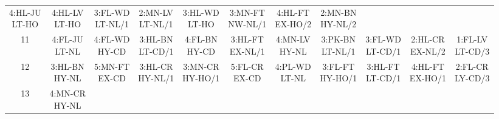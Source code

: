 \begin{table}[htbp]
{\begin{minipage}{0.9\textwidth}
\begin{tabular}{c|cccccccccc}
    \parbox{\cellwidth}{4:HL-JU\\LT-HO} & 
    \parbox{\cellwidth}{4:HL-LV\\LT-HO} & 
    \parbox{\cellwidth}{3:FL-WD\\LT-NL/1} & 
    \parbox{\cellwidth}{2:MN-LV\\LT-NL/1} & 
    \parbox{\cellwidth}{3:HL-WD\\LT-HO} & 
    \parbox{\cellwidth}{3:MN-FT\\NW-NL/1} & 
    \parbox{\cellwidth}{4:HL-FT\\EX-HO/2} & 
    \parbox{\cellwidth}{2:MN-BN\\HY-NL/2}\\[\extralinespace]
    11 & 
    \parbox{\cellwidth}{4:FL-JU\\LT-NL} & 
    \parbox{\cellwidth}{4:FL-WD\\HY-CD} & 
    \parbox{\cellwidth}{3:HL-BN\\LT-CD/1} & 
    \parbox{\cellwidth}{4:FL-BN\\HY-CD} & 
    \parbox{\cellwidth}{3:HL-FT\\EX-NL/1} & 
    \parbox{\cellwidth}{4:MN-LV\\HY-NL} & 
    \parbox{\cellwidth}{3:PK-BN\\LT-NL/1} & 
    \parbox{\cellwidth}{3:FL-WD\\LT-CD/1} & 
    \parbox{\cellwidth}{2:HL-CR\\EX-NL/2} & 
    \parbox{\cellwidth}{1:FL-LV\\LT-CD/3}\\[\extralinespace]
    12 & 
    \parbox{\cellwidth}{3:HL-BN\\HY-NL} & 
    \parbox{\cellwidth}{5:MN-FT\\EX-CD} & 
    \parbox{\cellwidth}{3:HL-CR\\HY-NL/1} & 
    \parbox{\cellwidth}{3:MN-CR\\HY-HO/1} & 
    \parbox{\cellwidth}{5:FL-CR\\EX-CD} & 
    \parbox{\cellwidth}{4:PL-WD\\LT-NL} & 
    \parbox{\cellwidth}{3:FL-FT\\HY-HO/1} & 
    \parbox{\cellwidth}{3:HL-FT\\LT-CD/1} & 
    \parbox{\cellwidth}{4:HL-FT\\EX-HO/1} & 
    \parbox{\cellwidth}{2:FL-CR\\LY-CD/3}\\[\extralinespace]
    13 & 
    \parbox{\cellwidth}{4:MN-CR\\HY-NL} & 

\end{tabular}
\end{minipage}}
\end{table}
